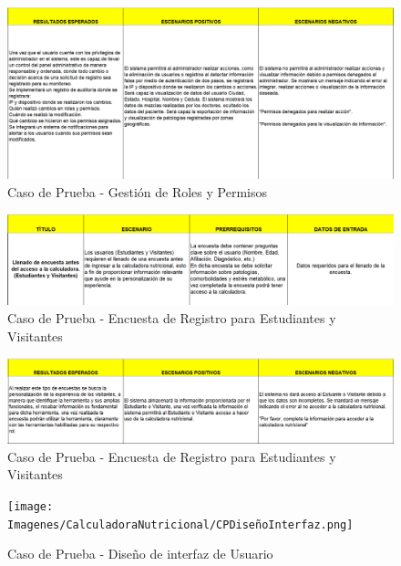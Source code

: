 \documentclass[12pt,letterpaper,spanish, xcolor=table]{report}
\numberwithin{figure}{subsection}
\begin{document}
	\begin{figure}[H]
		\centering
		\includegraphics[width=1.0\textwidth]
		{Imagenes/CalculadoraNutricional/CPRolesPermisos2.png}
		\caption{Caso de Prueba - Gestión de Roles y Permisos
		}\label{a2}
	\end{figure}
	
	\begin{figure}[H]
		\centering
		\includegraphics[width=1.0\textwidth]
		{Imagenes/CalculadoraNutricional/CPEncuestaEstudiante.png}
		\caption{Caso de Prueba - Encuesta de Registro para Estudiantes y Visitantes
		}\label{a2}
	\end{figure}
	
	\begin{figure}[H]
		\centering
		\includegraphics[width=1.0\textwidth]
		{Imagenes/CalculadoraNutricional/CPEncuestaEstudiante2.png}
		\caption{Caso de Prueba - Encuesta de Registro para Estudiantes y Visitantes
		}\label{a2}
	\end{figure}

	\begin{figure}[H]
		\centering
		\texttt{[image: Imagenes/CalculadoraNutricional/CPDiseñoInterfaz.png]}
		\caption{Caso de Prueba - Diseño de interfaz de Usuario
		}\label{a2}
	\end{figure}
	
\end{document}
